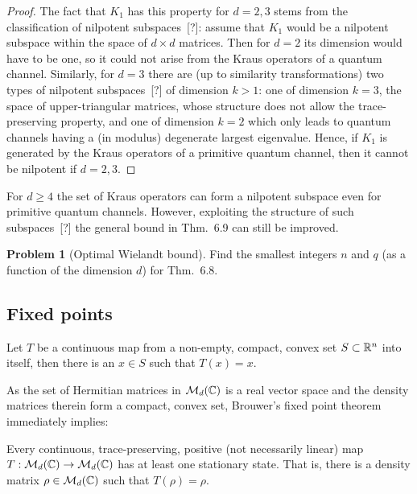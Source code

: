 \documentclass[11pt,a4paper]{article}
\theoremstyle{plain}
\theoremstyle{definition}
\newtheorem{problem}{Problem} %
\theoremstyle{remark}
\begin{document}
\begin{proof}
    The fact that $K_1$ has this property for $d=2,3$ stems from the classification
    of nilpotent subspaces~[?]: assume that $K_1$ would be a nilpotent subspace
    within the space of $d\times d$ matrices. Then for $d=2$ its dimension would have
    to be one, so it could not arise from the Kraus operators of a quantum channel.
    Similarly, for $d=3$ there are (up to similarity transformations) two types of
    nilpotent subspaces~[?] of dimension $k>1$: one of dimension $k=3$, the space of
    upper-triangular matrices, whose structure does not allow the trace-preserving
    property, and one of dimension $k=2$ which only leads to quantum channels having
    a (in modulus) degenerate largest eigenvalue. Hence, if $K_1$ is generated by the
    Kraus operators of a primitive quantum channel, then it cannot be nilpotent if
    $d=2,3$.
\end{proof}

For $d\ge 4$ the set of Kraus operators can form a nilpotent subspace even for
primitive quantum channels. However, exploiting the structure of such
subspaces~[?] the general bound in Thm.~6.9 can still be improved.

\setcounter{problem}{11}
\begin{problem}[Optimal Wielandt bound]
Find the smallest integers $n$ and $q$ (as a function of the dimension $d$) for
Thm.~6.8.
\end{problem}

\subsection{Fixed points}

\begin{theorem}
    Let $T$ be a continuous map from a non-empty, compact, convex set
    $S\subset \mathbb{R}^n$ into itself, then there is an $x\in S$ such that $T(x)=x$.
\end{theorem}

As the set of Hermitian matrices in $\mathcal{M}_d(\mathbb{C})$ is a real vector space and the
density matrices therein form a compact, convex set, Brouwer's fixed point
theorem immediately implies:

\begin{theorem}
    Every continuous, trace-preserving, positive (not necessarily linear) map
    $T:\mathcal{M}_d(\mathbb{C})\to\mathcal{M}_d(\mathbb{C})$ has at least one stationary state. That is, there
    is a density matrix $\rho\in\mathcal{M}_d(\mathbb{C})$ such that $T(\rho)=\rho$.
\end{theorem}
\end{document}
